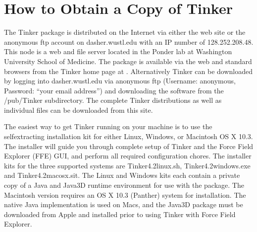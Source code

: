 \documentclass[letterpaper,11pt,english]{sphinxmanual}
\begin{document}
\section{How to Obtain a Copy of Tinker}
\label{\detokenize{text/installation:how-to-obtain-a-copy-of-tinker}}
The Tinker package is distributed on the Internet via either the web site or the anonymous ftp account on dasher.wustl.edu with an IP number of 128.252.208.48. This node is a web and file server located in the Ponder lab at Washington University School of Medicine. The package is available via the web and standard browsers from the Tinker home page at . Alternatively Tinker can be downloaded by logging into dasher.wustl.edu via anonymous ftp (Username: anonymous, Password: “your email address”) and downloading the software from the /pub/Tinker subdirectory. The complete Tinker distributions as well as individual files can be downloaded from this site.

The easiest way to get Tinker running on your machine is to use the self\sphinxhyphen{}extracting installation kit for either Linux, Windows, or Macintosh OS X 10.3. The installer will guide you through complete setup of Tinker and the Force Field Explorer (FFE) GUI, and perform all required configuration chores. The installer kits for the three supported systems are Tinker4.2\sphinxhyphen{}linux.sh, Tinker4.2\sphinxhyphen{}windows.exe and Tinker4.2\sphinxhyphen{}macosx.sit. The Linux and Windows kits each contain a private copy of a Java and Java3D run\sphinxhyphen{}time environment for use with the package. The Macintosh version requires an OS X 10.3 (Panther) system for installation. The native Java implementation is used on Macs, and the Java3D package must be downloaded from Apple and installed prior to using Tinker with Force Field Explorer.
\end{document}
